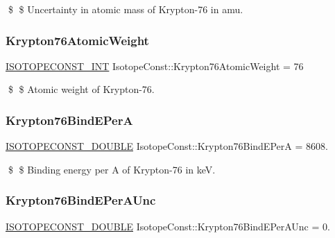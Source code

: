 \$ \$ Uncertainty in atomic mass of Krypton-\/76 in amu. \mbox{\label{group___isotope_const-_krypton-_kr76_ga7f81faaab8635af4aeb44d52d19f3379}} 
\subsubsection{\texorpdfstring{Krypton76\+Atomic\+Weight}{Krypton76AtomicWeight}}
{\footnotesize\ttfamily \mbox{\hyperlink{group___isotope_const-_macros_ga5f18360b3e99483a35c32d789e62621c}{I\+S\+O\+T\+O\+P\+E\+C\+O\+N\+S\+T\+\_\+\+I\+NT}} Isotope\+Const\+::\+Krypton76\+Atomic\+Weight = 76}

\$ \$ Atomic weight of Krypton-\/76. \mbox{\label{group___isotope_const-_krypton-_kr76_gacb315d256ee4568f1b871974e59d9bbc}} 
\subsubsection{\texorpdfstring{Krypton76\+Bind\+E\+PerA}{Krypton76BindEPerA}}
{\footnotesize\ttfamily \mbox{\hyperlink{group___isotope_const-_macros_ga8f45a7272ce02c0b4c65c44636ed719a}{I\+S\+O\+T\+O\+P\+E\+C\+O\+N\+S\+T\+\_\+\+D\+O\+U\+B\+LE}} Isotope\+Const\+::\+Krypton76\+Bind\+E\+PerA = 8608.}

\$ \$ Binding energy per A of Krypton-\/76 in keV. \mbox{\label{group___isotope_const-_krypton-_kr76_gaea798761990c51fa3ec780627e5f4c7a}} 
\subsubsection{\texorpdfstring{Krypton76\+Bind\+E\+Per\+A\+Unc}{Krypton76BindEPerAUnc}}
{\footnotesize\ttfamily \mbox{\hyperlink{group___isotope_const-_macros_ga8f45a7272ce02c0b4c65c44636ed719a}{I\+S\+O\+T\+O\+P\+E\+C\+O\+N\+S\+T\+\_\+\+D\+O\+U\+B\+LE}} Isotope\+Const\+::\+Krypton76\+Bind\+E\+Per\+A\+Unc = 0.}

